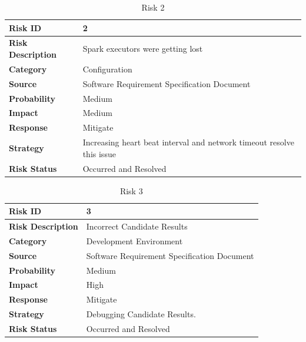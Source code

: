 \documentclass[oneside,a4paper,12pt]{pictreport}
\begin{document}
\begin{table}[h!]
\centering
\caption{Risk 2}
\label{my-label}
\begin{tabular}{|l|l|}
\hline
\textbf{Risk ID}          & 2                                                                     \\ \hline
\textbf{Risk Description} & Spark executors were getting lost                                     \\ \hline
\textbf{Category}         & Configuration                                                         \\ \hline
\textbf{Source}           & Software Requirement Specification Document                           \\ \hline
\textbf{Probability}      & Medium                                                                \\ \hline
\textbf{Impact}           & Medium                                                                \\ \hline
\textbf{Response}         & Mitigate                                                              \\ \hline
\textbf{Strategy}         & Increasing heart beat interval and network timeout resolve this issue \\ \hline
\textbf{Risk Status}      & Occurred and Resolved                                                 \\ \hline
\end{tabular}
\end{table}
\begin{table}[h!]
\centering
\caption{Risk 3}
\label{my-label}
\begin{tabular}{|l|l|}
\hline
\textbf{Risk ID}          & 3                                           \\ \hline
\textbf{Risk Description} & Incorrect Candidate Results                 \\ \hline
\textbf{Category}         & Development Environment                     \\ \hline
\textbf{Source}           & Software Requirement Specification Document \\ \hline
\textbf{Probability}      & Medium                                      \\ \hline
\textbf{Impact}           & High                                        \\ \hline
\textbf{Response}         & Mitigate                                    \\ \hline
\textbf{Strategy}         & Debugging Candidate Results.                \\ \hline
\textbf{Risk Status}      & Occurred and Resolved                       \\ \hline
\end{tabular}
\end{table}
\newpage
\end{document}
